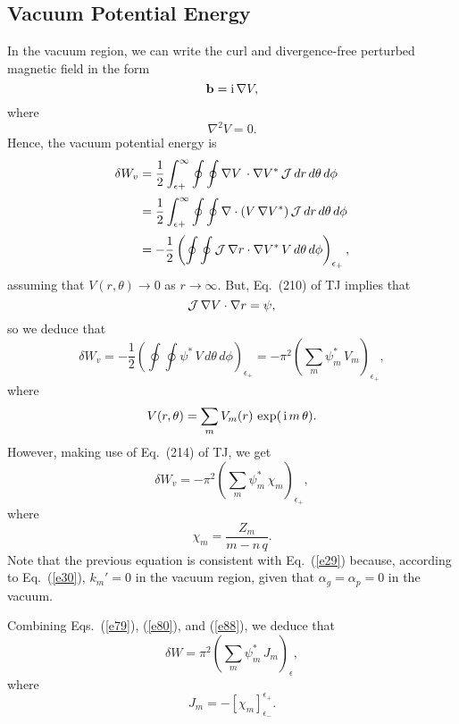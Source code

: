 \documentclass[12pt,prb,aps,notitlepage]{revtex4-1}
\begin{document}
\subsection{Vacuum Potential Energy}
In the vacuum region, we can write the curl and divergence-free perturbed magnetic field in the form 
\begin{equation}
{\bf b} = {\rm i}\,\nabla V,
\end{equation}
where
\begin{equation}
\nabla^2 V =0.
\end{equation}
Hence, the vacuum potential energy is
\begin{align}
\delta W_v &= \frac{1}{2}\int_{\epsilon+}^\infty\oint\oint\nabla V\,\cdot\nabla V^\ast\,{\cal J}\,dr\,d\theta\,d\phi\nonumber\\[0.5ex]
&= \frac{1}{2}\int_{\epsilon+}^\infty\oint\oint  \nabla\cdot(V\,\nabla V^\ast)\,{\cal J}\,dr\,d\theta\,d\phi\nonumber\\[0.5ex]
&=-\frac{1}{2}\left(\oint\oint {\cal J}\,\nabla r\cdot\nabla V^\ast\,V\,d\theta\,d\phi\right)_{\epsilon_+},
\end{align}
assuming that $V(r,\theta)\rightarrow 0$ as $r\rightarrow \infty$. 
But, Eq.~(210) of TJ implies that 
\begin{equation}
{\cal J}\,\nabla V\cdot\nabla r = \psi,
\end{equation}
so we deduce that
\begin{equation}\label{e87}
\delta W_v = -\frac{1}{2}\left(\oint\oint \psi^\ast\,V\,d\theta\,d\phi\right)_{\epsilon_{+}} =- \pi^2\left(\sum_m \psi_m^\ast\,V_m\right)_{\epsilon_{+}},
\end{equation}
where
\begin{equation}
V(r,\theta)= \sum_m V_m(r)\,\exp(\,{\rm i}\,m\,\theta).
\end{equation}
However, making use of Eq.~(214) of TJ, we get
\begin{equation}\label{e88}
\delta W_v =-\pi^2\left(\sum_m\psi_m^\ast\,\chi_m\right)_{\epsilon_+},
\end{equation}
where
\begin{equation}\label{e89}
\chi_m=\frac{Z_m}{m-n\,q}.
 \end{equation}
 Note that the previous equation is consistent with Eq.~(\ref{e29}) because, according to Eq.~(\ref{e30}),  $k_m'=0$ in the vacuum region, given that $\alpha_g=\alpha_p=0$ in the vacuum. 

Combining Eqs.~(\ref{e79}), (\ref{e80}), and (\ref{e88}), we deduce that
\begin{equation}\label{e89a}
\delta W = \pi^2\left(\sum_m\psi_m^\ast\,J_m\right)_\epsilon,
\end{equation}
where
\begin{equation}\label{e90}
J_m= -\left[\chi_m\right]_{\epsilon_-}^{\epsilon_+}.
\end{equation}
\end{document}
